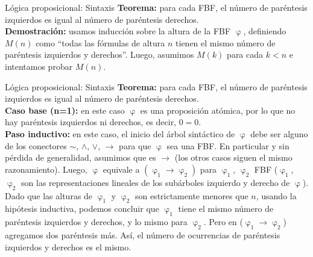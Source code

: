 \documentclass{beamer}
\begin{document}
\begin{frame}{Lógica proposicional: Sintaxis}
  \textbf{Teorema:} para cada FBF, el número de paréntesis izquierdos es igual al número de paréntesis derechos.\\

  \textbf{Demostración:} usamos inducción sobre la altura de la FBF $\upvarphi$,
  definiendo $M(n)$ como “todas las fórmulas de altura $n$ tienen el mismo
  número de paréntesis izquierdos y derechos”. Luego, asumimos $M(k)$ para cada
  $k < n$ e intentamos probar $M(n)$.
\end{frame}


\begin{frame}{Lógica proposicional: Sintaxis}
  \textbf{Teorema:} para cada FBF, el número de paréntesis izquierdos es igual al número de paréntesis derechos.\\

  \textbf{Caso base (n=1):} en este caso $\upvarphi$ es una proposición atómica,
  por lo que no hay paréntesis izquierdos ni derechos, es decir, $0 = 0$.\\

  \textbf{Paso inductivo:} en este caso, el inicio del árbol sintáctico de
  $\upvarphi$ debe ser alguno de los conectores $\sim$, $\land$, $\vee$,
  $\rightarrow$ para que $\upvarphi$ sea una FBF. En particular y sin pérdida de
  generalidad, asumimos que es $\rightarrow$ (los otros casos siguen el mismo
  razonamiento). Luego, $\upvarphi$ equivale a
  $(\upvarphi_{1} \rightarrow \upvarphi_{2})$ para $\upvarphi_{1}$,
  $\upvarphi_{2}$ FBF ($\upvarphi_{1}$, $\upvarphi_{2}$ son las representaciones
  lineales de los subárboles izquierdo y derecho de $\upvarphi$). Dado que las
  alturas de $\upvarphi_{1}$ y $\upvarphi_{2}$ son estrictamente menores que
  $n$, usando la hipótesis inductiva, podemos concluir que $\upvarphi_{1}$ tiene
  el mismo número de paréntesis izquierdos y derechos, y lo mismo para
  $\upvarphi_{2}$. Pero en ($\upvarphi_{1} \rightarrow \upvarphi_{2}$) agregamos
  dos paréntesis más. Así, el número de ocurrencias de paréntesis izquierdos y
  derechos es el mismo.
\end{frame}
\end{document}

